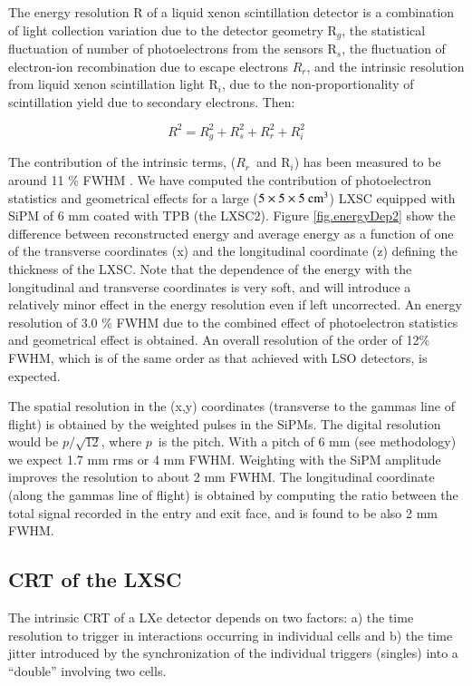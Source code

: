 \documentclass[review]{elsarticle}
\begin{document}
The energy resolution R of a liquid xenon scintillation detector is a combination of light collection variation due to the detector geometry R$_g$, the statistical fluctuation of number of photoelectrons from the sensors R$_s$, the fluctuation of electron-ion recombination due to escape electrons $R_r$, and the intrinsic resolution from liquid xenon scintillation light R$_i$, due to the non-proportionality of scintillation yield due to secondary electrons. Then:

\begin{equation}
R^2 = R_g^2 + R_s^2 + R_r^2 + R_i^2
\end{equation}

The contribution of the intrinsic terms, ($R_r$~and R$_i$) has been measured to be
around 11 \% FWHM \cite{aprileRes}. We have computed the contribution of photoelectron statistics and geometrical effects for a large
($5 \times 5 \times 5 {\rm ~cm^3}$) LXSC equipped with SiPM of 6 mm coated with TPB (the LXSC2).  
Figure \ref{fig.energyDep2} show the difference between reconstructed energy and average energy as a function of one of the transverse coordinates (x) and the longitudinal coordinate (z) defining the thickness of the LXSC. Note that the dependence of the energy with the longitudinal and transverse coordinates is very soft, and will introduce a relatively minor effect in the energy resolution even if left uncorrected. An energy resolution of 3.0 \% FWHM due to the combined effect of photoelectron statistics and geometrical effect is obtained. 
An overall resolution of the order of 12\% FWHM, which is of the same order as that achieved with LSO detectors, is expected. 

The spatial resolution in the (x,y) coordinates (transverse to the gammas line of flight) is obtained by the weighted pulses in the SiPMs. The digital resolution would be
$p/\sqrt{12}$, where $p$~is the pitch. With a pitch of 6 mm (see methodology) we expect 1.7 mm rms or 4 mm FWHM. Weighting with the SiPM amplitude improves the resolution to about 2 mm FWHM. The longitudinal coordinate (along the gammas line of flight) is obtained by computing the ratio between the
total signal recorded in the entry and exit face, and is found to be also 2 mm FWHM. 


\subsection*{CRT  of the LXSC}

The intrinsic CRT of a LXe detector depends on two factors: a) the time resolution to trigger in interactions occurring in individual cells and b) the time jitter introduced by the synchronization of the individual triggers (singles) into a ``double'' involving two cells. 
\end{document}
